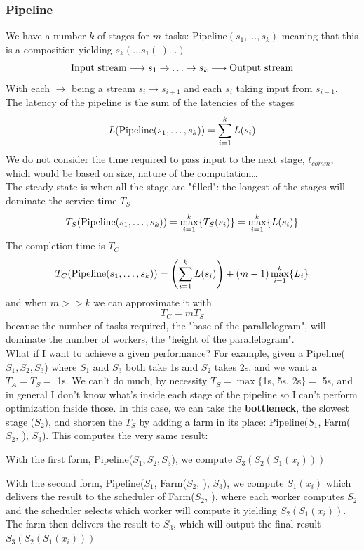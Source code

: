 \documentclass[10pt]{report}
\begin{document}
\subsubsection{Pipeline}
We have a number $k$ of stages for $m$ tasks: Pipeline$(s_1,\ldots,s_k)$ meaning that this is a composition yielding $s_k(\ldots s_1(\:)\ldots)$
$$\hbox{Input stream}\longrightarrow s_1\rightarrow\ldots\rightarrow s_k\longrightarrow\hbox{Output stream}$$
With each $\rightarrow$ being a stream $s_i\rightarrow s_{i+1}$ and each $s_i$ taking input from $s_{i-1}$.\\
The latency of the pipeline is the sum of the latencies of the stages $$L(\hbox{Pipeline}(s_1,\ldots,s_k)) = \sum_{i=1}^k L(s_i)$$
We do not consider the time required to pass input to the next stage, $t_{comm}$, which would be based on size, nature of the computation\ldots\\
The steady state is when all the stage are "filled": the longest of the stages will dominate the service time $T_S$
$$T_S(\hbox{Pipeline}(s_1,\ldots,s_k)) = \max_{i=1}^k\{T_S(s_i)\} = \max_{i=1}^k\{L(s_i)\}$$
The completion time is $T_C$
$$T_C(\hbox{Pipeline}(s_1,\ldots,s_k)) = \left(\sum_{i=1}^k L(s_i)\right) + (m-1)\max_{i=1}^k\{L_i\}$$
and when $m >> k$ we can approximate it with
$$T_C = mT_S$$
because the number of tasks required, the "base of the parallelogram", will dominate the number of workers, the "height of the parallelogram".\\
What if I want to achieve a given performance? For example, given a Pipeline($S_1, S_2, S_3$) where $S_1$ and $S_3$ both take 1s and $S_2$ takes 2s, and we want a $T_A=T_S=$ 1s. We can't do much, by necessity $T_S=\max\{$1s, 5s, 2s$\}=$ 5s, and in general I don't know what's inside each stage of the pipeline so I can't perform optimization inside those. In this case, we can take the \textbf{bottleneck}, the slowest stage ($S_2$), and shorten the $T_S$ by adding a farm in its place: Pipeline($S_1$, Farm($S_2,\:$), $S_3$). This computes the very same result:
\begin{list}{}{}
	\item With the first form, Pipeline($S_1, S_2, S_3$), we compute $S_3(S_2(S_1(x_i)))$
	\item With the second form, Pipeline($S_1$, Farm($S_2,\:$), $S_3$), we compute $S_1(x_i)$ which delivers the result to the scheduler of Farm($S_2,\:$), where each worker computes $S_2$ and the scheduler selects which worker will compute it yielding $S_2(S_1(x_i))$. The farm then delivers the result to $S_3$, which will output the final result $S_3(S_2(S_1(x_i)))$
\end{list}
\end{document}
